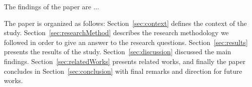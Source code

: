 The findings of the paper are ...



The paper is organized as follows: Section~\ref{sec:context} defines the context of the study. Section~\ref{sec:researchMethod} describes the research methodology we followed in order to give an answer to the research questions. Section~\ref{sec:results} presents the results of the study. Section~\ref{sec:discussion} discussed the main findings. Section~\ref{sec:relatedWorks} presents related works, and finally the paper concludes in Section~\ref{sec:conclusion} with final remarks and direction for future works.